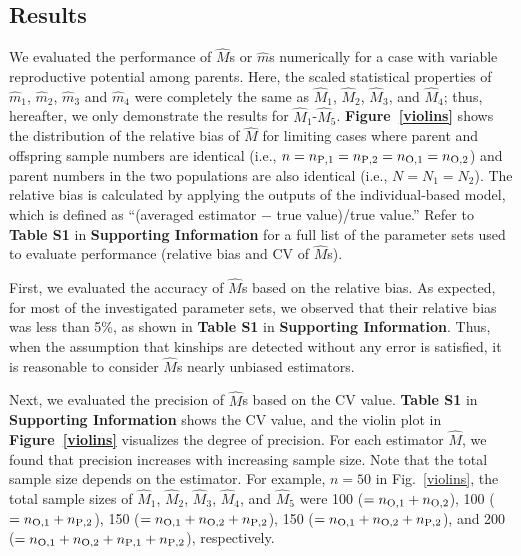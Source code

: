 \documentclass[12pt, English]{article}
\begin{document}
\begin{spacing}{1.9}
\section{Results}\label{sec3}

We evaluated the performance of ${\hat M}$s or ${\hat m}$s numerically for a case with variable reproductive potential among parents. Here, the scaled statistical properties of ${\hat m_1}$,  ${\hat m_2}$,  ${\hat m_3}$ and ${\hat m_4}$ were completely the same as ${\hat M_1}$, ${\hat M_2}$, ${\hat M_3}$, and ${\hat M_4}$; thus, hereafter, we only demonstrate the results for ${\hat M_1}$-${\hat M_5}$. {\bf Figure~\ref{violins}} shows the distribution of the relative bias of ${\hat M}$ for limiting cases where parent and offspring sample numbers are identical (i.e., $n=n_{\rm P,1}=n_{\rm P,2}=n_{\rm O,1}= n_{\rm O,2}$) and parent numbers in the two populations are also identical (i.e., $N=N_1=N_2$). The relative bias is calculated by applying the outputs of the individual-based model, which is defined as ``(averaged estimator $-$ true value)/true value.'' Refer to {\bf Table S1} in {\bf Supporting Information} for a full list of the parameter sets used to evaluate performance (relative bias and CV of ${\hat M}$s). 
 
\begin{center}
\end{center}

First, we evaluated the accuracy of ${\hat M}$s based on the relative bias. As expected, for most of the investigated parameter sets, we observed that their relative bias was less than 5\%, as shown in {\bf Table S1} in {\bf Supporting Information}. Thus, when the assumption that kinships are detected without any error is satisfied, it is reasonable to consider ${\hat M}$s nearly unbiased estimators. 

Next, we evaluated the precision of ${\hat M}$s based on the CV value. {\bf Table S1} in {\bf Supporting Information} shows the CV value, and the violin plot in {\bf Figure~\ref{violins}} visualizes the degree of precision. For each estimator ${\hat M}$, we found that precision increases with increasing sample size. Note that the total sample size depends on the estimator. For example, $n=50$ in Fig.~\ref{violins}, the total sample sizes of ${\hat M_1}$, ${\hat M_2}$, ${\hat M_3}$, ${\hat M_4}$, and ${\hat M_5}$ were 100 ($=n_{\rm O,1}+n_{\rm O,2}$), 100 ($=n_{\rm O,1}+n_{\rm P,2}$), 150 ($=n_{\rm O,1}+n_{\rm O,2}+n_{\rm P,2}$), 150 ($=n_{\rm O,1}+n_{\rm O,2}+n_{\rm P,2}$), and 200 ($=n_{\rm O,1}+n_{\rm O,2}+n_{\rm P,1}+n_{\rm P,2}$), respectively. 


\end{spacing}
\end{document}
